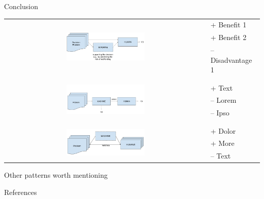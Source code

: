 \documentclass[11pt]{beamer}
\begin{document}
\begin{frame}{Conclusion}
\begin{table}[]
	\begin{tabular}{cl}
		\multirow{3}{*}{\includegraphics[width=0.4\textwidth]{Figures/human_decision.pdf}}&   + Benefit 1 		 \\
		& + Benefit 2\\
		& -- Disadvantage 1\\ 
		&\\
		\hline
		&\\
		\multirow{3}{*}{\includegraphics[width=0.4\textwidth]{Figures/defect.pdf}}&   	+ Text			\\
		& -- Lorem \\
		& -- Ipso \\
		&\\
		\hline
		&\\
		\multirow{3}{*}{\includegraphics[width=0.4\textwidth]{Figures/matching.pdf}}&   + Dolor				\\
		& + More \\
		& -- Text \\
	\end{tabular}
\end{table}
\end{frame}

\begin{frame}{Other patterns worth mentioning}
\end{frame}

\begin{frame}{References}
\end{frame}
\end{document}
